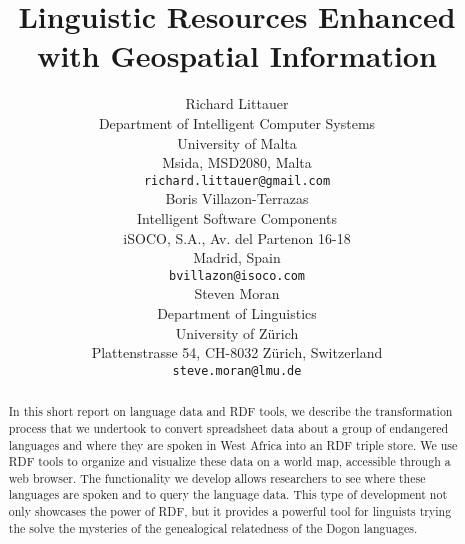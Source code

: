 \documentclass[11pt]{article}
\title{Linguistic Resources Enhanced with Geospatial Information}
\author{Richard Littauer \\
Department of Intelligent Computer Systems \\
University of Malta \\ 
Msida, MSD2080, Malta \\
  {\tt richard.littauer@gmail.com} \\\And
  Boris Villazon-Terrazas \\
  Intelligent Software Components \\
   iSOCO, S.A., Av. del Partenon 16-18 \\
   Madrid, Spain\\
{\tt bvillazon@isoco.com} \\\And
Steven Moran \\
Department of Linguistics \\
 University of Z\"urich \\
  Plattenstrasse 54, CH-8032 Z\"urich, Switzerland \\
  {\tt steve.moran@lmu.de} \\}
\date{}
\begin{document}
\maketitle
\begin{abstract}

In this short report on language data and RDF tools, we describe the transformation process that we undertook to convert spreadsheet data about a group of endangered languages and where they are spoken in West Africa into an RDF triple store. We use RDF tools to organize and visualize these data on a world map, accessible through a web browser. The functionality we develop allows researchers to see where these languages are spoken and to query the language data. This type of development not only showcases the power of RDF, but it provides a powerful tool for linguists trying the solve the mysteries of the genealogical relatedness of the Dogon languages.

\end{abstract}
\end{document}
